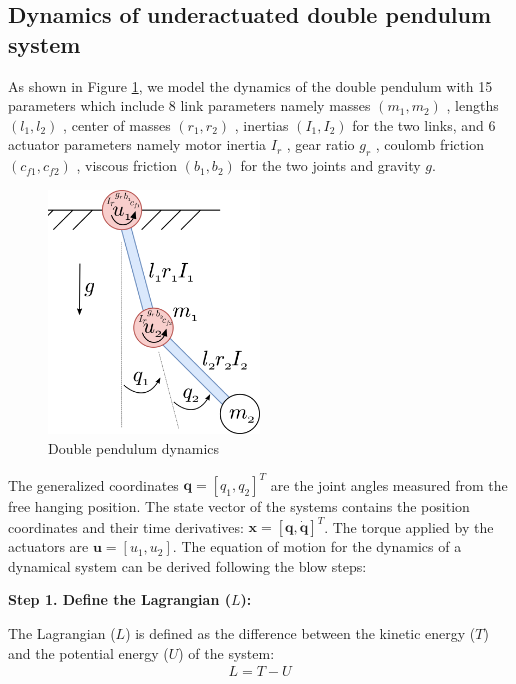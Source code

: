 \subsection{Dynamics of underactuated double pendulum system}
As shown in Figure \ref{fig:double pendulum dynamics}, we model the dynamics of the double pendulum with 15 parameters which include 8 link parameters namely masses \((m_1,m_2)\)
, lengths \((l_1,l_2)\)
, center of masses \((r_1,r_2)\) 
, inertias \((I_1,I_2)\)
 for the two links, and 6 actuator parameters namely motor inertia \(I_r\)
, gear ratio \(g_r\)
, coulomb friction \((c_{f1},c_{f2})\)
, viscous friction \((b_1,b_2)\)
 for the two joints and gravity \(g\).
\begin{figure}[h]
  \centering
  \includegraphics[width=0.5\textwidth]{figures/double_pendulum_dynamics.png} %
  \caption{Double pendulum dynamics}
  \label{fig:double pendulum dynamics}
\end{figure}

The generalized coordinates \( \mathbf{q} =[q_1,q_2]^T \) are the joint angles measured from the free hanging position. The state vector of the systems contains the position coordinates and their time derivatives: \(\mathbf{x}=[\mathbf{q},\mathbf{\dot{q}}]^T\). The torque applied by the actuators are \(\mathbf{u}=[u_1,u_2]\). The equation of motion for the dynamics of a dynamical system can be derived following the blow steps:

\textbf{Step 1. Define the Lagrangian (\(L\)):}

   The Lagrangian (\(L\)) is defined as the difference between the kinetic energy (\(T\)) and the potential energy (\(U\)) of the system:
   \begin{align}
         L = T - U
   \end{align}


